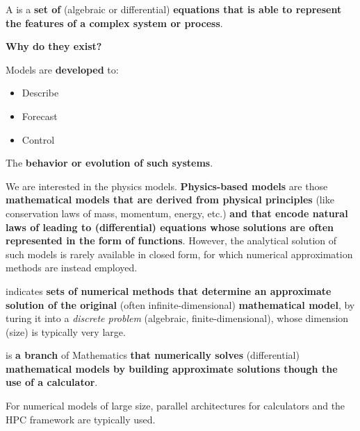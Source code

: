 \begin{definitionbox}
    A  is a \textbf{set of} (algebraic or differential) \textbf{equations that is able to represent the features of a complex system or process}.

    \begin{flushleft}
        \textcolor{Green3}{ \textbf{Why do they exist?}}
    \end{flushleft}
    Models are \textbf{developed} to:
    \begin{itemize}
        \item Describe
        \item Forecast
        \item Control
    \end{itemize}
    The \textbf{behavior or evolution of such systems}.
\end{definitionbox}

\highspace
We are interested in the physics models. \textbf{Physics-based models} are those \textbf{mathematical models that are derived from physical principles} (like conservation laws of mass, momentum, energy, etc.) \textbf{and that encode natural laws of leading to (differential) equations whose solutions are often represented in the form of functions}. However, the analytical solution of such models is rarely available in closed form, for which numerical approximation methods are instead employed.

\highspace
\begin{definitionbox}
     indicates \textbf{sets of numerical methods that determine an approximate solution of the original} (often infinite-dimensional) \textbf{mathematical model}, by turing it into a \emph{discrete problem} (algebraic, finite-dimensional), whose dimension (size) is typically very large.
\end{definitionbox}

\highspace
\begin{definitionbox}
     is \textbf{a branch} of Mathematics \textbf{that numerically solves} (differential) \textbf{mathematical models by building approximate solutions though the use of a calculator}.
\end{definitionbox}

\highspace
For numerical models of large size, parallel architectures for calculators and the HPC framework are typically used.

